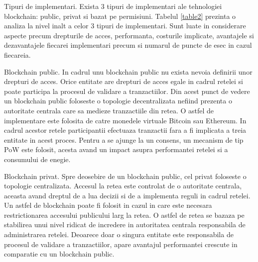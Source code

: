 \documentclass[12pt,a4paper,twoside]{report}
\begin{document}
	
	Tipuri de implementari. Exista 3 tipuri de implementari ale tehnologiei blockchain: public, privat si bazat pe permisiuni. Tabelul \ref{table2} prezinta o analiza la nivel inalt a celor 3 tipuri de implementari. Sunt luate in considerare aspecte precum drepturile de acces, performanta, costurile implicate, avantajele si dezavantajele fiecarei implementari precum si numarul de puncte de esec in cazul fiecareia.
	
	Blockchain public. In cadrul unu blockchain public nu exista nevoia definirii unor  drepturi de acces. Orice entitate are drepturi de acces egale in cadrul retelei si poate participa la procesul de validare a tranzactiilor. Din acest punct de vedere un blockchain public foloseste o topologie decentralizata nefiind prezenta o autoritate centrala care sa medieze tranzactiile din retea. O astfel de implementare este folosita de catre monedele virtuale Bitcoin sau Ethereum. In cadrul acestor retele participantii efectuaza tranzactii fara a fi implicata a treia entitate in acest proces. Pentru a se ajunge la un consens, un mecanism de tip PoW este folosit, acesta avand un impact asupra performantei retelei si a consumului de enegie.
	
	Blockchain privat. Spre deosebire de un blockchain public, cel privat foloseste o topologie centralizata. Accesul la retea este controlat de o autoritate centrala, aceasta avand dreptul de a lua decizii si de a implementa reguli in cadrul retelei. Un astfel de blockchain poate fi folosit in cazul in care este necesara restrictionarea accesului publicului larg la retea. O astfel de retea se bazaza pe stabilirea unui nivel ridicat de incredere in autoritatea centrala responsabila de administrarea retelei. Deoarece doar o singura entitate este responsabila de procesul de validare a tranzactiilor, apare avantajul performantei crescute in comparatie cu un blockchain public.
	
\end{document}
